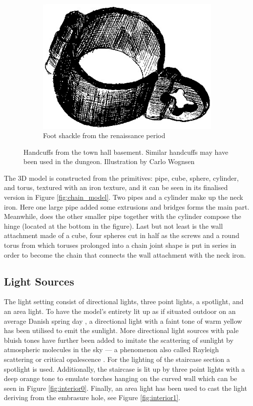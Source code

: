 \begin{figure}
\begin{subfigure}[h!]{0.3\textwidth}
        \includegraphics[width=\textwidth]{figures/chains2.jpg}
        \caption{Foot shackle from the renaissance period}\label{fig:chains2}
    \end{subfigure}
    \caption{Handcuffs from the town hall basement. Similar handcuffs may have been used in the dungeon. Illustration by Carlo Wognsen \cite{Riismoller1961}}\label{fig:chains}
\end{figure}

The 3D model is constructed from the primitives: pipe, cube, sphere, cylinder, and torus, textured with an iron texture, and it can be seen in its finalised version in  Figure \ref{fig:chain_model}. 
Two pipes and a cylinder make up the neck iron. Here one large pipe added some extrusions and bridges forms the main part. Meanwhile, does the other smaller pipe together with the cylinder compose the hinge (located at the bottom in the figure). Last but not least is the wall attachment made of a cube, four spheres cut in half as the screws and a round torus from which toruses prolonged into a chain joint shape is put in series in order to become the chain that connects the wall attachment with the neck iron.

\subsection{Light Sources}
The light setting consist of directional lights, three point lights, a spotlight, and an area light. To have the model’s entirety lit up as if situated outdoor on an average Danish spring day \cite{DMI}, a directional light with a faint tone of warm yellow has been utilised to emit the sunlight. More directional light sources with pale bluish tones have further been added to imitate the scattering of sunlight by atmospheric molecules in the sky --- a phenomenon also called Rayleigh scattering or critical opalescence \cite{DOE} \cite{Renn2005}. For the lighting of the staircase section a spotlight is used. Additionally, the staircase is lit up by three point lights with a deep orange tone to emulate torches hanging on the curved wall which can be seen in Figure \ref{fig:interior0}. Finally, an area light has been used to cast the light deriving from the embrasure hole, see Figure \ref{fig:interior1}.


